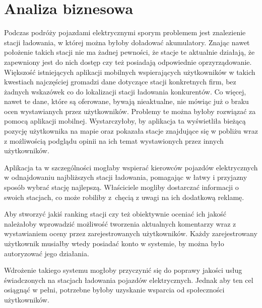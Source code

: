 \section{Analiza biznesowa}
Podczas podróży pojazdami elektrycznymi sporym problemem jest znalezienie stacji ładowania, w której można byłoby doładować akumulatory. Znając nawet położenie takich stacji nie ma żadnej pewności, że stacje te aktualnie działają, że zapewniony jest do nich dostęp czy też posiadają odpowiednie oprzyrządowanie. Większość istniejących aplikacji mobilnych wspierających użytkowników w takich kwestiach najczęściej gromadzi dane dotyczące stacji konkretnych firm, bez żadnych wskazówek co do lokalizacji stacji ładowania konkurentów. Co więcej, nawet te dane, które są oferowane, bywają nieaktualne, nie mówiąc już o braku ocen wystawianych przez użytkowników. Problemy te można byłoby rozwiązać za pomocą aplikacji mobilnej. Wystarczyłoby, by aplikacja ta wyświetliła bieżącą pozycję użytkownika na mapie oraz pokazała stacje znajdujące się w pobliżu wraz z możliwością podglądu opinii na ich temat wystawionych przez innych użytkowników.

Aplikacja ta w szczególności mogłaby wspierać kierowców pojazdów elektrycznych w odnajdowaniu najbliższych stacji ładowania, pomagając w łatwy i przyjazny sposób wybrać stację najlepszą. Właściciele mogliby dostarczać informacji o swoich stacjach, co może robiliby z~chęcią z uwagi na ich dodatkową reklamę.

Aby stworzyć jakiś ranking stacji czy też obiektywnie oceniać ich jakość należałoby wprowadzić możliwość tworzenia aktualnych komentarzy wraz z wystawianiem oceny przez zarejestrowanych użytkowników. Każdy zarejestrowany użytkownik musiałby wtedy posiadać konto w systemie, by można było autoryzować jego działania.

Wdrożenie takiego systemu mogłoby przyczynić się do poprawy jakości usług świadczonych na stacjach ładowania pojazdów elektrycznych.
Jednak aby ten cel osiągnąć w pełni, potrzebne byłoby uzyskanie wsparcia od społeczności użytkowników.

